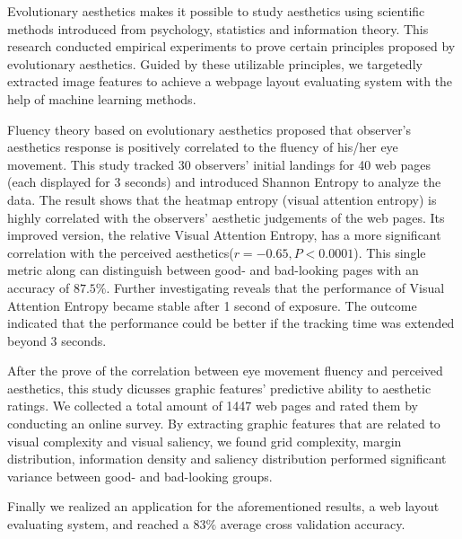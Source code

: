 \begin{englishabstract}

Evolutionary aesthetics makes it possible to study aesthetics using scientific methods introduced from psychology, statistics and information theory. This research conducted empirical experiments to prove certain principles proposed by evolutionary aesthetics. Guided by these utilizable principles, we targetedly extracted image features to achieve a webpage layout evaluating system with the help of machine learning methods.

Fluency theory based on evolutionary aesthetics proposed that observer's aesthetics response is positively correlated to the fluency of his/her eye movement. This study tracked 30 observers' initial landings for 40 web pages (each displayed for 3 seconds) and introduced Shannon Entropy to analyze the data. The result shows that the heatmap entropy (visual attention entropy) is highly correlated with the observers' aesthetic judgements of the web pages. Its improved version, the relative Visual Attention Entropy, has a more significant correlation with the perceived aesthetics($r = -0.65, P < 0.0001$). This single metric along can distinguish between good- and bad-looking pages with an accuracy of $87.5\%$. Further investigating reveals that the performance of Visual Attention Entropy became stable after 1 second of exposure. The outcome indicated that the performance could be better if the tracking time was extended beyond 3 seconds.

After the prove of the correlation between eye movement fluency and perceived aesthetics, this study dicusses graphic features' predictive ability to aesthetic ratings.
We collected a total amount of 1447 web pages and rated them by conducting an online survey. By extracting graphic features that are related to visual complexity and visual saliency, we found grid complexity, margin distribution, information density and saliency distribution performed significant variance between good- and bad-looking groups.

Finally we realized an application for the aforementioned results, a web layout evaluating system, and reached a $83\%$ average cross validation accuracy.

\end{englishabstract}
